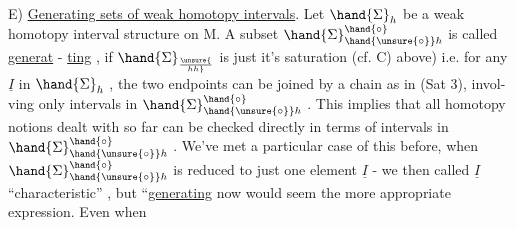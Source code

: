 E) \uline{Generating sets of  weak homotopy intervals}.  Let $\hand{\Sigma}_h$ be a
weak homotopy interval structure on M.  A subset $\hand{\Sigma}^{\hand{\circ}}_{\hand{\unsure{\circ}}h}$ is called \uline{generat} -%
\uline{ting} , if $\hand{\Sigma}_{\unsure{\over{h}{h}}}$ is just it's saturation (cf. C) above) i.e. for any $\underline{I}$ in
$\hand{\Sigma}_h$ , the two endpoints can be joined by a chain\unsure{\xout{,}} as in (Sat 3), invol-%
ving only intervals in $\hand{\Sigma}^{\hand{\circ}}_{\hand{\unsure{\circ}}h}$ . This implies that all homotopy notions
dealt with  so far can be checked directly in terms of intervals in
$\hand{\Sigma}^{\hand{\circ}}_{\hand{\unsure{\circ}}h}$ . We've met a particular case of this before, when $\hand{\Sigma}^{\hand{\circ}}_{\hand{\unsure{\circ}}h}$ is reduced
to just one element $\underline{I}$ - we then called $\underline{I}$ ``characteristic'' , but
``\uline{generating}  now would seem the more appropriate expression. Even when

